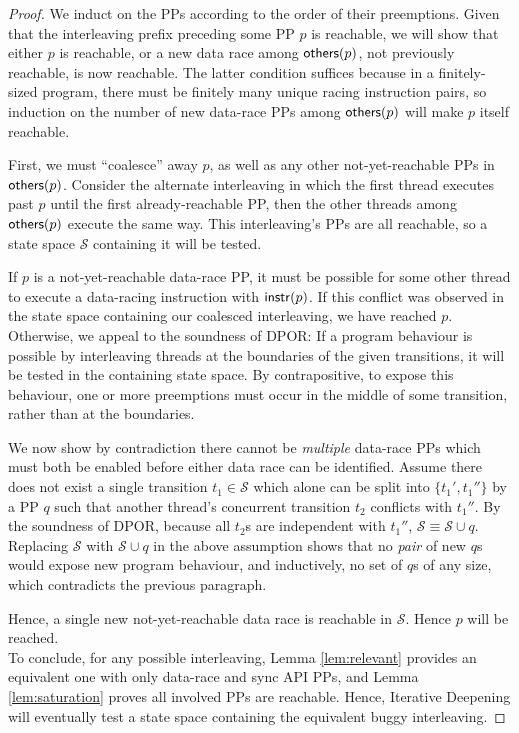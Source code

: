 \begin{proof}
We induct on the PPs according to the order of their preemptions.
Given that the interleaving prefix preceding some PP $p$ is reachable,
we will show that either $p$ is reachable, or a new data race among $\mathsf{others}(p)$, not previously reachable, is now reachable.
The latter condition suffices because in a finitely-sized program, there must be finitely many unique racing instruction pairs, so induction on the number of new data-race PPs among $\mathsf{others}(p)$ will make $p$ itself reachable.

First, we must ``coalesce'' away $p$, as well as any other not-yet-reachable PPs in $\mathsf{others}(p)$.
Consider the alternate interleaving in which the first thread executes past $p$ until the first already-reachable PP,
then the other threads among $\mathsf{others}(p)$ execute the same way.
This interleaving's PPs are all reachable, so a state space $\mathcal{S}$ containing it will be tested.

If $p$ is a not-yet-reachable data-race PP,
it must be possible for some other thread to execute a data-racing instruction with $\mathsf{instr}(p)$.
If this conflict was observed in the state space containing our coalesced interleaving, we have reached $p$.
Otherwise, we appeal to the soundness of DPOR:
If a program behaviour is possible by interleaving threads at the boundaries of the given transitions,
it will be tested in the containing state space.
By contrapositive, to expose this behaviour, one or more preemptions must occur in the middle of some transition, rather than at the boundaries.

We now show by contradiction there cannot be {\em multiple} data-race PPs which must both be enabled before either data race can be identified.
Assume there does not exist a single transition $t_1 \in \mathcal{S}$ which alone can be split into $\{t_1',t_1''\}$ by a PP $q$ such that another thread's concurrent transition $t_2$ conflicts with $t_1''$.
By the soundness of DPOR, because all $t_2$s are independent with $t_1''$, $\mathcal{S} \equiv \mathcal{S} \cup q$.
Replacing $\mathcal{S}$ with $\mathcal{S} \cup q$ in the above assumption shows that no {\em pair} of new $q$s would expose new program behaviour, and inductively, no set of $q$s of any size, which contradicts the previous paragraph.

Hence, a single new not-yet-reachable data race is reachable in $\mathcal{S}$. Hence $p$ will be reached.
\\

To conclude,
for any possible interleaving, Lemma \ref{lem:relevant} provides an equivalent one with only data-race and sync API PPs,
and Lemma \ref{lem:saturation} proves all involved PPs are reachable.
Hence, Iterative Deepening will eventually test a state space containing the equivalent buggy interleaving.
\end{proof}

